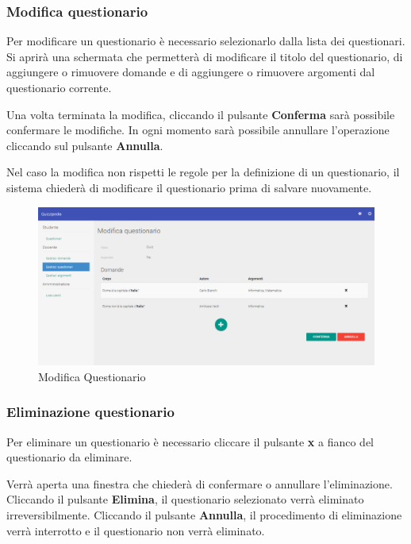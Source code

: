 \documentclass[12pt,a4paper]{article}
\begin{document}
		\subsubsection{Modifica questionario}
		\par Per modificare un questionario è necessario selezionarlo dalla lista dei questionari. Si aprirà una schermata che permetterà di modificare il titolo del questionario, di aggiungere o rimuovere domande e di aggiungere o rimuovere argomenti dal questionario corrente. \\
		\par Una volta terminata la modifica, cliccando il pulsante \textbf{Conferma} sarà possibile confermare le modifiche. In ogni momento sarà possibile annullare l'operazione cliccando sul pulsante \textbf{Annulla}. \\
			
		\par Nel caso la modifica non rispetti le regole per la definizione di un questionario, il sistema chiederà di modificare il questionario prima di salvare nuovamente. \\
		
		\begin{figure}[H]	
			\centering
			\includegraphics[width=1.0\linewidth]{../img/screenshot/modificaQuestionario.png}
			\caption{Modifica Questionario}
			\label{Modifica Questionario}
		\end{figure}
			
		\subsubsection{Eliminazione questionario}
		\par Per eliminare un questionario è necessario cliccare il pulsante \textbf{x} a fianco del questionario da eliminare. \\
		\par Verrà aperta una finestra che chiederà di confermare o annullare l'eliminazione. Cliccando il pulsante \textbf{Elimina}, il questionario selezionato verrà eliminato irreversibilmente. Cliccando il pulsante \textbf{Annulla}, il procedimento di eliminazione verrà interrotto e il questionario non verrà eliminato. \\
		
\end{document}
